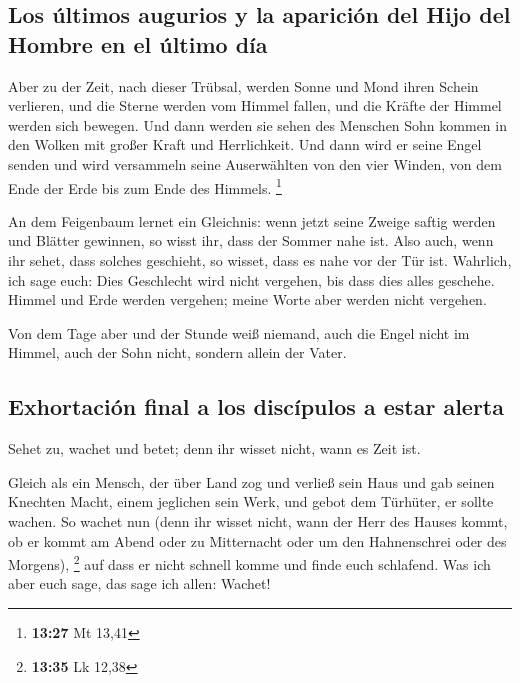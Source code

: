 \hypertarget{los-uxfaltimos-augurios-y-la-apariciuxf3n-del-hijo-del-hombre-en-el-uxfaltimo-duxeda}{%
\subsection{Los últimos augurios y la aparición del Hijo del Hombre en
el último
día}\label{los-uxfaltimos-augurios-y-la-apariciuxf3n-del-hijo-del-hombre-en-el-uxfaltimo-duxeda}}

 Aber zu der Zeit, nach dieser Trübsal, werden Sonne und
Mond ihren Schein verlieren,  und die Sterne werden vom
Himmel fallen, und die Kräfte der Himmel werden sich bewegen.
 Und dann werden sie sehen des Menschen Sohn kommen in
den Wolken mit großer Kraft und Herrlichkeit.  Und dann
wird er seine Engel senden und wird versammeln seine Auserwählten von
den vier Winden, von dem Ende der Erde bis zum Ende des Himmels.
\footnote{\textbf{13:27} Mt 13,41}

 An dem Feigenbaum lernet ein Gleichnis: wenn jetzt seine
Zweige saftig werden und Blätter gewinnen, so wisst ihr, dass der Sommer
nahe ist.  Also auch, wenn ihr sehet, dass solches
geschieht, so wisset, dass es nahe vor der Tür ist. 
Wahrlich, ich sage euch: Dies Geschlecht wird nicht vergehen, bis dass
dies alles geschehe.  Himmel und Erde werden vergehen;
meine Worte aber werden nicht vergehen.

 Von dem Tage aber und der Stunde weiß niemand, auch die
Engel nicht im Himmel, auch der Sohn nicht, sondern allein der Vater.

\hypertarget{exhortaciuxf3n-final-a-los-discuxedpulos-a-estar-alerta}{%
\subsection{Exhortación final a los discípulos a estar
alerta}\label{exhortaciuxf3n-final-a-los-discuxedpulos-a-estar-alerta}}

 Sehet zu, wachet und betet; denn ihr wisset nicht, wann
es Zeit ist.

 Gleich als ein Mensch, der über Land zog und verließ
sein Haus und gab seinen Knechten Macht, einem jeglichen sein Werk, und
gebot dem Türhüter, er sollte wachen.  So wachet nun
(denn ihr wisset nicht, wann der Herr des Hauses kommt, ob er kommt am
Abend oder zu Mitternacht oder um den Hahnenschrei oder des Morgens),
\footnote{\textbf{13:35} Lk 12,38}  auf dass er nicht
schnell komme und finde euch schlafend.  Was ich aber
euch sage, das sage ich allen: Wachet!

